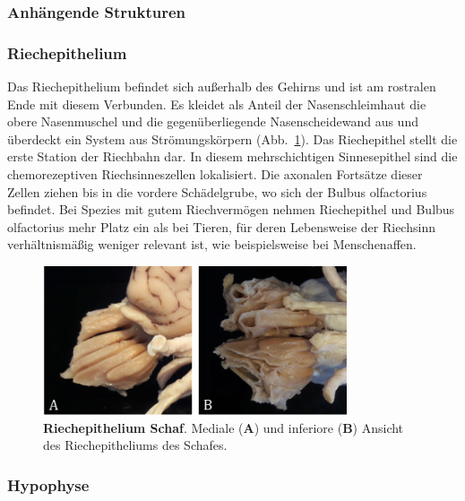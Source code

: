 \documentclass[12pt,a4paper,pdftex]{article}
\begin{document}
\subsubsection{Anhängende Strukturen}
\label{subsubsec:Hirnanhangsstrukturen}

\subsubsection*{Riechepithelium} 

Das Riechepithelium befindet sich außerhalb des Gehirns und ist am rostralen Ende mit diesem Verbunden. Es kleidet als Anteil der Nasenschleimhaut die obere Nasenmuschel und die gegenüberliegende Nasenscheidewand aus und überdeckt  ein  System aus Strömungskörpern (Abb.~\ref{fig:Riechepithel}). Das Riechepithel stellt die erste Station der Riechbahn dar. In diesem mehrschichtigen Sinnesepithel sind die chemorezeptiven Riechsinneszellen lokalisiert. Die axonalen Fortsätze dieser Zellen ziehen bis in die vordere Schädelgrube, wo sich der Bulbus olfactorius befindet. Bei Spezies mit gutem Riechvermögen nehmen Riechepithel und Bulbus olfactorius mehr Platz ein als bei Tieren, für deren Lebensweise der Riechsinn verhältnismäßig weniger relevant ist, wie beispielsweise bei Menschenaffen.

\begin{figure}[H]
    \centering
    \includegraphics[width=0.8\textwidth]{pictures/Bilder_Jule/Schaf/Ausschnitte/Riechepithel.png}
    \caption[Riechepithelium Schaf]{\textbf{Riechepithelium Schaf}. Mediale (\textbf{A}) und inferiore (\textbf{B}) Ansicht des Riechepitheliums des Schafes.}
    \label{fig:Riechepithel}
\end{figure}{}


\subsubsection*{Hypophyse}
\label{subsubsec:hypophyse} 
\end{document}
